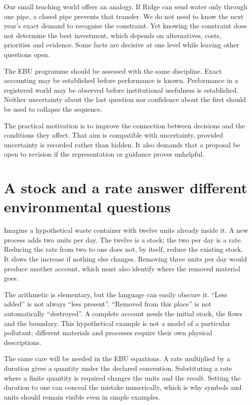 Our small teaching world offers an analogy. If Ridge can send water only through one pipe, a closed pipe prevents that transfer. We do not need to know the next year's exact demand to recognise the constraint. Yet knowing the constraint does not determine the best investment, which depends on alternatives, costs, priorities and evidence. Some facts are decisive at one level while leaving other questions open.

The EBU programme should be assessed with the same discipline. Exact accounting may be established before performance is known. Performance in a registered world may be observed before institutional usefulness is established. Neither uncertainty about the last question nor confidence about the first should be used to collapse the sequence.

The practical motivation is to improve the connection between decisions and the conditions they affect. That aim is compatible with uncertainty, provided uncertainty is recorded rather than hidden. It also demands that a proposal be open to revision if the representation or guidance proves unhelpful.

\section{A stock and a rate answer different environmental questions}
Imagine a hypothetical waste container with twelve units already inside it. A new process adds two units per day. The twelve is a stock; the two per day is a rate. Reducing the rate from two to one does not, by itself, reduce the existing stock. It slows the increase if nothing else changes. Removing three units per day would produce another account, which must also identify where the removed material goes.

The arithmetic is elementary, but the language can easily obscure it. ``Less added'' is not always ``less present''. ``Removed from this place'' is not automatically ``destroyed''. A complete account needs the initial stock, the flows and the boundary. This hypothetical example is not a model of a particular pollutant; different materials and processes require their own physical descriptions.

The same care will be needed in the EBU equations. A rate multiplied by a duration gives a quantity under the declared convention. Substituting a rate where a finite quantity is required changes the units and the result. Setting the duration to one can conceal the mistake numerically, which is why symbols and units should remain visible even in simple examples.


